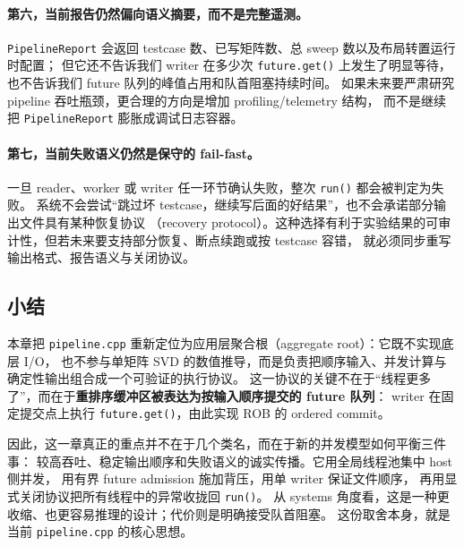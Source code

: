\paragraph{第六，当前报告仍然偏向语义摘要，而不是完整遥测。}
\texttt{PipelineReport} 会返回 testcase 数、已写矩阵数、总 sweep 数以及布局转置运行时配置；
但它还不告诉我们 writer 在多少次 \texttt{future.get()} 上发生了明显等待，
也不告诉我们 future 队列的峰值占用和队首阻塞持续时间。
如果未来要严肃研究 pipeline 吞吐瓶颈，更合理的方向是增加 profiling/telemetry 结构，
而不是继续把 \texttt{PipelineReport} 膨胀成调试日志容器。

\paragraph{第七，当前失败语义仍然是保守的 fail-fast。}
一旦 reader、worker 或 writer 任一环节确认失败，整次 \texttt{run()} 都会被判定为失败。
系统不会尝试“跳过坏 testcase，继续写后面的好结果”，也不会承诺部分输出文件具有某种恢复协议
（recovery protocol）。这种选择有利于实验结果的可审计性，但若未来要支持部分恢复、断点续跑或按 testcase 容错，
就必须同步重写输出格式、报告语义与关闭协议。

\subsection{小结}

本章把 \texttt{pipeline.cpp} 重新定位为应用层聚合根（aggregate root）：它既不实现底层 I/O，
也不参与单矩阵 SVD 的数值推导，而是负责把顺序输入、并发计算与确定性输出组合成一个可验证的执行协议。
这一协议的关键不在于“线程更多了”，而在于\textbf{重排序缓冲区被表达为按输入顺序提交的 future 队列}：
writer 在固定提交点上执行 \texttt{future.get()}，由此实现 ROB 的 ordered commit。

因此，这一章真正的重点并不在于几个类名，而在于新的并发模型如何平衡三件事：
较高吞吐、稳定输出顺序和失败语义的诚实传播。它用全局线程池集中 host 侧并发，
用有界 future admission 施加背压，用单 writer 保证文件顺序，
再用显式关闭协议把所有线程中的异常收拢回 \texttt{run()}。
从 systems 角度看，这是一种更收缩、也更容易推理的设计；代价则是明确接受队首阻塞。
这份取舍本身，就是当前 \texttt{pipeline.cpp} 的核心思想。
